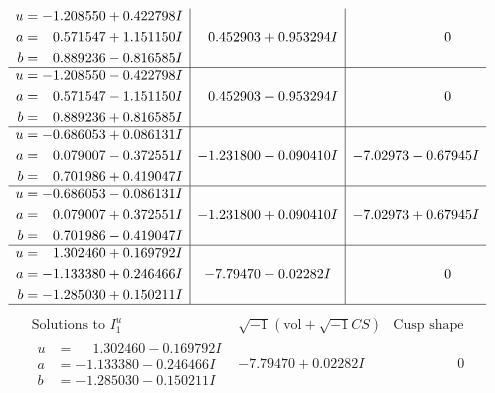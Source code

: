 \documentclass[1p]{elsarticle_modified}
\theoremstyle{definition}
\newcommand{\I}{\sqrt{-1}}
\begin{document}
$$\begin{array}{c|c|c}
\begin{aligned}
u &= -1.208550 + 0.422798 I \\
a &= \phantom{-}0.571547 + 1.151150 I \\
b &= \phantom{-}0.889236 - 0.816585 I\end{aligned}
 & \phantom{-}0.452903 + 0.953294 I & \phantom{-0.000000 } 0 \\ \hline\begin{aligned}
u &= -1.208550 - 0.422798 I \\
a &= \phantom{-}0.571547 - 1.151150 I \\
b &= \phantom{-}0.889236 + 0.816585 I\end{aligned}
 & \phantom{-}0.452903 - 0.953294 I & \phantom{-0.000000 } 0 \\ \hline\begin{aligned}
u &= -0.686053 + 0.086131 I \\
a &= \phantom{-}0.079007 - 0.372551 I \\
b &= \phantom{-}0.701986 + 0.419047 I\end{aligned}
 & -1.231800 - 0.090410 I & -7.02973 - 0.67945 I \\ \hline\begin{aligned}
u &= -0.686053 - 0.086131 I \\
a &= \phantom{-}0.079007 + 0.372551 I \\
b &= \phantom{-}0.701986 - 0.419047 I\end{aligned}
 & -1.231800 + 0.090410 I & -7.02973 + 0.67945 I \\ \hline\begin{aligned}
u &= \phantom{-}1.302460 + 0.169792 I \\
a &= -1.133380 + 0.246466 I \\
b &= -1.285030 + 0.150211 I\end{aligned}
 & -7.79470 - 0.02282 I & \phantom{-0.000000 } 0\\
 \hline 
 \end{array}$$\newpage$$\begin{array}{c|c|c}  
\text{Solutions to }I^u_{1}& \I (\text{vol} + \sqrt{-1}CS) & \text{Cusp shape}\\
 \hline 
\begin{aligned}
u &= \phantom{-}1.302460 - 0.169792 I \\
a &= -1.133380 - 0.246466 I \\
b &= -1.285030 - 0.150211 I\end{aligned}
 & -7.79470 + 0.02282 I & \phantom{-0.000000 } 0 \\ \hline\begin{aligned}

\end{aligned}
\end{array}$$
\end{document}
